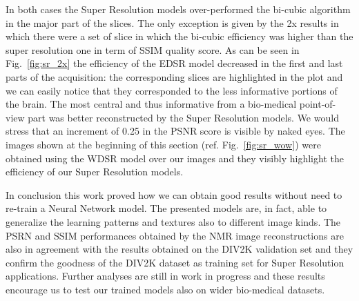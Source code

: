 \documentclass{standalone}
\begin{document}
In both cases the Super Resolution models over-performed the bi-cubic algorithm in the major part of the slices.
The only exception is given by the 2x results in which there were a set of slice in which the bi-cubic efficiency was higher than the super resolution one in term of SSIM quality score.
As can be seen in Fig.~\ref{fig:sr_2x} the efficiency of the EDSR model decreased in the first and last parts of the acquisition: the corresponding slices are highlighted in the plot and we can easily notice that they corresponded to the less informative portions of the brain.
The most central and thus informative from a bio-medical point-of-view part was better reconstructed by the Super Resolution models.
We would stress that an increment of 0.25 in the PSNR score is visible by naked eyes.
The images shown at the beginning of this section (ref. Fig.~\ref{fig:sr_wow}) were obtained using the WDSR model over our images and they visibly highlight the efficiency of our Super Resolution models.

In conclusion this work proved how we can obtain good results without need to re-train a Neural Network model.
The presented models are, in fact, able to generalize the learning patterns and textures also to different image kinds.
The PSRN and SSIM performances obtained by the NMR image reconstructions are also in agreement with the results obtained on the DIV2K validation set and they confirm the goodness of the DIV2K dataset as training set for Super Resolution applications.
Further analyses are still in work in progress and these results encourage us to test our trained models also on wider bio-medical datasets.
\end{document}
